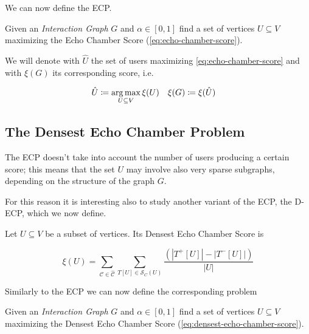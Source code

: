 We can now define the \acrfull{ECP}.

\begin{problem}
Given an \emph{Interaction Graph} $G$ and $\alpha \in [0, 1]$ find a set of vertices $U \subseteq
	V$ maximizing the Echo Chamber Score (\autoref{eq:echo-chamber-score}).
\end{problem}

We will denote with $\hat{U}$ the set of users maximizing
\autoref{eq:echo-chamber-score} and with $\xi(G)$ its corresponding score, i.e.

\begin{align*}
	\hat{U} & \coloneqq \operatorname*{arg\,max}_{U \subseteq V} \xi(U) & \xi(G) & \coloneqq
	\xi(\hat{U})
\end{align*}

\subsection{The Densest Echo Chamber Problem}%
\label{sub:the_densest_echo_chamber_problem}

The \acrshort{ECP} doesn't take into account the number of users producing a
certain score; this means that the set $U$ may involve also very sparse
subgraphs, depending on the structure of the graph $G$.

For this reason it is interesting also to study another variant of the
\acrshort{ECP}, the \acrlong{D-ECP}, which we now define.

\begin{definition}
	Let $U \subseteq V$ be a subset of vertices. Its Densest Echo Chamber Score is

	\begin{equation}
		\label{eq:densest-echo-chamber-score}
		\xi(U) = \sum^{}_{\mathcal{C} \in \mathcal{\hat{C}}} \sum^{}_{T[U] \in
		\mathcal{S} _{C} (U)} \frac{(|T^{+} [U]| - |T ^{-} [U]|)}{|U|}
	\end{equation}
\end{definition}

Similarly to the \acrshort{ECP} we can now define the corresponding problem

\begin{problem}
Given an \emph{Interaction Graph} $G$ and $\alpha \in [0, 1]$ find a set of vertices $U \subseteq
	V$ maximizing the Densest Echo Chamber Score (\autoref{eq:densest-echo-chamber-score}).
\end{problem}

